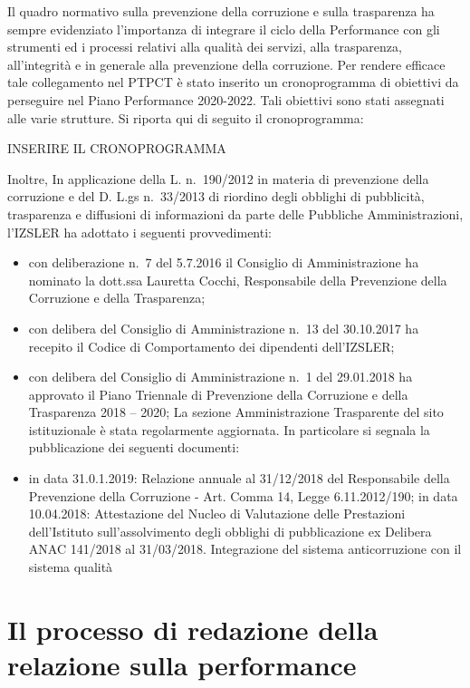 \documentclass[
  12pt,
]{article}
\providecommand{\tightlist}{%
  \setlength{\itemsep}{0pt}\setlength{\parskip}{0pt}}
\begin{document}
Il quadro normativo sulla prevenzione della corruzione e sulla
trasparenza ha sempre evidenziato l'importanza di integrare il ciclo
della Performance con gli strumenti ed i processi relativi alla qualità
dei servizi, alla trasparenza, all'integrità e in generale alla
prevenzione della corruzione. Per rendere efficace tale collegamento nel
PTPCT è stato inserito un cronoprogramma di obiettivi da perseguire nel
Piano Performance 2020-2022. Tali obiettivi sono stati assegnati alle
varie strutture. Si riporta qui di seguito il cronoprogramma:

INSERIRE IL CRONOPROGRAMMA

Inoltre, In applicazione della L. n.~190/2012 in materia di prevenzione
della corruzione e del D. L.gs n.~33/2013 di riordino degli obblighi di
pubblicità, trasparenza e diffusioni di informazioni da parte delle
Pubbliche Amministrazioni, l'IZSLER ha adottato i seguenti
provvedimenti:

\begin{itemize}
\tightlist
\item
  con deliberazione n.~7 del 5.7.2016 il Consiglio di Amministrazione ha
  nominato la dott.ssa Lauretta Cocchi, Responsabile della Prevenzione
  della Corruzione e della Trasparenza;
\item
  con delibera del Consiglio di Amministrazione n.~13 del 30.10.2017 ha
  recepito il Codice di Comportamento dei dipendenti dell'IZSLER;
\item
  con delibera del Consiglio di Amministrazione n.~1 del 29.01.2018 ha
  approvato il Piano Triennale di Prevenzione della Corruzione e della
  Trasparenza 2018 -- 2020; La sezione Amministrazione Trasparente del
  sito istituzionale è stata regolarmente aggiornata. In particolare si
  segnala la pubblicazione dei seguenti documenti:
\item
  in data 31.0.1.2019: Relazione annuale al 31/12/2018 del Responsabile
  della Prevenzione della Corruzione - Art. Comma 14, Legge
  6.11.2012/190; in data 10.04.2018: Attestazione del Nucleo di
  Valutazione delle Prestazioni dell'Istituto sull'assolvimento degli
  obblighi di pubblicazione ex Delibera ANAC 141/2018 al 31/03/2018.
  Integrazione del sistema anticorruzione con il sistema qualità
\end{itemize}

\hypertarget{il-processo-di-redazione-della-relazione-sulla-performance}{%
\section{Il processo di redazione della relazione sulla
performance}\label{il-processo-di-redazione-della-relazione-sulla-performance}}
\end{document}
